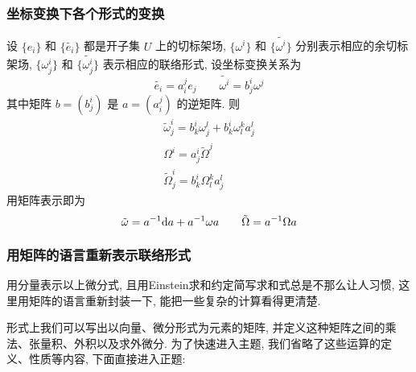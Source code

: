 \documentclass{book}
\newcommand{\md}{{\rm d}}
\begin{document}
        \subsubsection{坐标变换下各个形式的变换}
            设 $\{e_i\}$ 和 $\{\tilde{e_i}\}$ 都是开子集 $U$ 上的切标架场, $\{\omega^i\}$ 和 $\{\tilde{\omega^i}\}$ 分别表示相应的余切标架场,
            $\{\omega^i_j\}$ 和 $\{\tilde{\omega^i_j}\}$ 表示相应的联络形式, 设坐标变换关系为
            \begin{equation*}
                \tilde{e_i} = a^j_ie_j\qquad \tilde{\omega^i} = b^i_j\omega^j
            \end{equation*}
            其中矩阵 $b = (b^i_j)$ 是 $a = (a^j_i)$ 的逆矩阵.
            则
            \begin{gather*}
                \tilde{\omega}^i_j = b^i_k\omega^l_j+b^i_k\omega^k_la^l_j \\
                \Omega^i = a^i_j\tilde{\Omega}^j \\
                \tilde{\Omega}^i_j = b^i_k\Omega^k_la^l_j
            \end{gather*}
            用矩阵表示即为
            \begin{equation*}
                \tilde{\omega} = a^{-1}\md a + a^{-1}\omega a \qquad \tilde{\Omega} = a^{-1}\Omega a
            \end{equation*}
        \subsubsection{用矩阵的语言重新表示联络形式}
            用分量表示以上微分式, 且用Einstein求和约定简写求和式总是不那么让人习惯, 这里用矩阵的语言重新封装一下, 能把一些复杂的计算看得更清楚.
            
            形式上我们可以写出以向量、微分形式为元素的矩阵, 并定义这种矩阵之间的乘法、张量积、外积以及求外微分. 为了快速进入主题, 我们省略了这些运算的定义、性质等内容, 
            下面直接进入正题:
\end{document}
